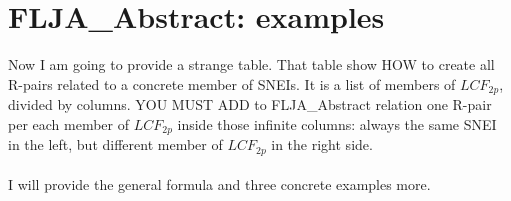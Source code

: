 \chapter{FLJA\_Abstract: examples}

	\noindent
	Now I am going to provide a strange table. That table show HOW to create all R-pairs related to a concrete member of SNEIs. It is a list of members of $LCF_{2p}$, divided by columns. YOU MUST ADD to FLJA\_Abstract relation one R-pair per each member of $LCF_{2p}$ inside those infinite columns: always the same SNEI in the left, but different member of $LCF_{2p}$ in the right side.
	\\\\
	
	\noindent
	I will provide the general formula and three concrete examples more.
	\\\\
	

